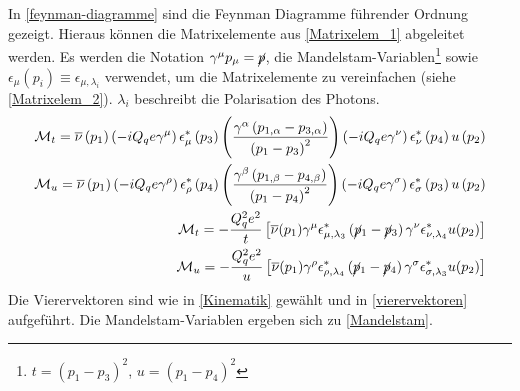In \textsf{\autoref{feynman-diagramme}} sind die Feynman Diagramme führender Ordnung gezeigt. Hieraus können die Matrixelemente aus \textsf{\autoref{Matrixelem_1}} abgeleitet werden. Es werden die Notation $\gamma^\mu p_\mu=\cancel{p}$, die Mandelstam-Variablen\footnote{$t = (p_1 - p_3)^2$, $u = (p_1 - p_4)^2$} sowie $\epsilon_\mu(p_i) \equiv \epsilon_{\mu, \lambda_i}$ verwendet, um die Matrixelemente zu vereinfachen (siehe \textsf{\autoref{Matrixelem_2}}). $\lambda_i$ beschreibt die Polarisation des Photons.
\begin{align}
\begin{split}
\label{Matrixelem_1}
\mathcal{M}_t = \overline{\nu}\left(p_1\right) \left(-iQ_qe\gamma^\mu\right) \epsilon^*_\mu\left(p_3\right) \left(\frac{\gamma^\alpha \left(p_{1,\alpha} - p_{3, \alpha}\right)}{\left(p_1 - p_3\right)^2}\right) \left(-iQ_qe\gamma^\nu\right) \epsilon^*_\nu\left(p_4\right) u\left( p_2\right) \\
\mathcal{M}_u = \overline{\nu}\left(p_1\right) \left(-iQ_qe\gamma^\rho\right) \epsilon^*_\rho\left(p_4\right) \left(\frac{\gamma^\beta \left(p_{1,\beta} - p_{4, \beta}\right)}{\left(p_1 - p_4\right)^2}\right) \left(-iQ_qe\gamma^\sigma\right) \epsilon^*_\sigma\left(p_3\right) u\left( p_2\right)
\end{split}
\\
\begin{split}
\mathcal{M}_t = -\frac{Q_q^2e^2}{t}\left[ \overline{\nu}(p_1) \gamma^\mu \epsilon^*_{\mu, \lambda_3} \left(\cancel{p}_1 - \cancel{p}_3\right) \gamma^\nu \epsilon^*_{\nu, \lambda_4} u(p_2)\right] \\
\mathcal{M}_u = -\frac{Q_q^2e^2}{u}\left[ \overline{\nu}(p_1) \gamma^\rho \epsilon^*_{\rho, \lambda_4} \left(\cancel{p}_1 - \cancel{p}_4\right) \gamma^\sigma \epsilon^*_{\sigma, \lambda_3} u(p_2)\right]
\label{Matrixelem_2}
\end{split}
\end{align}
Die Vierervektoren sind wie in \textsf{\autoref{Kinematik}} gewählt und in \textsf{\autoref{vierervektoren}} aufgeführt. Die Mandelstam-Variablen ergeben sich zu \textsf{\autoref{Mandelstam}}.
